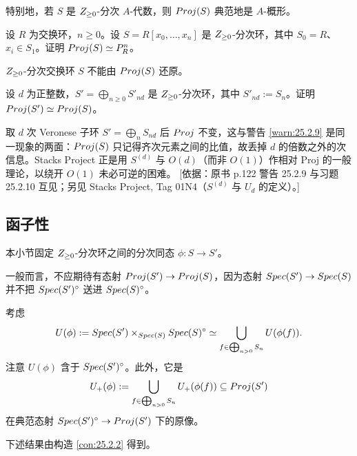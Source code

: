 特别地，若 $S$ 是 $Z_{\ge 0}$-分次 $A$-代数，则 $Proj(S)$ 典范地是 $A$-概形。

\begin{exercise}\label{exc:25.2.8}
设 $R$ 为交换环，$n \ge 0$。设 $S = R[x_0, \dots, x_n]$ 是 $Z_{\ge 0}$-分次环，其中 $S_0 = R$、$x_i \in S_1$。证明 $Proj(S) \simeq P^n_R$。
\end{exercise}

\begin{warning}\label{warn:25.2.9}
$Z_{\ge 0}$-分次交换环 $S$ 不能由 $Proj(S)$ 还原。
\end{warning}

\begin{exercise}\label{exc:25.2.10}
设 $d$ 为正整数，$S' = \bigoplus_{n \ge 0} S'_{nd}$ 是 $Z_{\ge 0}$-分次环，其中 $S'_{nd} := S_n$。证明 $Proj(S') \simeq Proj(S)$。
\end{exercise}

\begin{yizhu}
取 $d$ 次 Veronese 子环 $S' = \bigoplus_n S_{nd}$ 后 $Proj$ 不变，这与警告 \ref{warn:25.2.9} 是同一现象的两面：$Proj(S)$ 只记得齐次元素之间的比值，故丢掉 $d$ 的倍数之外的次信息。Stacks Project 正是用 $S^{(d)}$ 与 $O(d)$（而非 $O(1)$）作相对 Proj 的一般理论，以绕开 $O(1)$ 未必可逆的困难。
[依据：原书 p.122 警告 25.2.9 与习题 25.2.10 互见；另见 Stacks Project, Tag 01N4（$S^{(d)}$ 与 $U_d$ 的定义）。]
\end{yizhu}

\subsection{函子性}\label{sec:25.3}

本小节固定 $Z_{\ge 0}$-分次环之间的分次同态 $\phi \colon S \to S'$。

一般而言，不应期待有态射 $Proj(S') \to Proj(S)$，因为态射 $Spec(S') \to Spec(S)$ 并不把 $Spec(S')^{\circ}$ 送进 $Spec(S)^{\circ}$。

\begin{notation}\label{not:25.3.1}
考虑
\[
U(\phi) := Spec(S') \times_{Spec(S)} Spec(S)^{\circ} \simeq \bigcup_{f \in \bigoplus_{n>0} S_n} U(\phi(f)).
\]
注意 $U(\phi)$ 含于 $Spec(S')^{\circ}$。此外，它是
\[
U_+(\phi) := \bigcup_{f \in \bigoplus_{n>0} S_n} U_+(\phi(f)) \subseteq Proj(S')
\]
在典范态射 $Spec(S')^{\circ} \to Proj(S')$ 下的原像。
\end{notation}

下述结果由构造 \ref{con:25.2.2} 得到。


